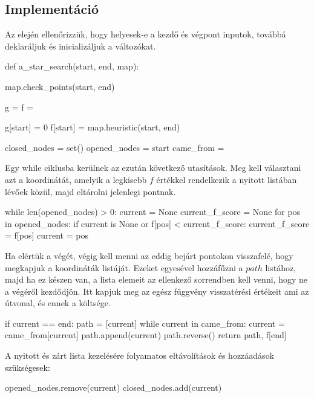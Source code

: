 \subsection{Implementáció}

Az elején ellenőrizzük, hogy helyesek-e a kezdő és végpont inputok, továbbá deklaráljuk és inicializáljuk a változókat.
\begin{python}
def a_star_search(start, end, map):

    map.check_points(start, end)

    g = {}  
    f = {}  

    g[start] = 0
    f[start] = map.heuristic(start, end)

    closed_nodes = set()
    opened_nodes = {start}
    came_from = {}
\end{python}

\bigskip

Egy while ciklusba kerülnek az ezután következő utasítások. Meg kell választani azt a koordinátát, amelyik a legkisebb $ f $ értékkel rendelkezik a nyitott listában lévőek közül, majd eltárolni jelenlegi pontnak. 
\begin{python}
	while len(opened_nodes) > 0:
        current = None
        current_f_score = None
        for pos in opened_nodes:
            if current is None or f[pos] < current_f_score:
                current_f_score = f[pos]
                current = pos

\end{python}

\bigskip

Ha elértük a végét, végig kell menni az eddig bejárt pontokon visszafelé, hogy megkapjuk a koordináták listáját. Ezeket egyesével hozzáfűzni a $ path $ listához, majd ha ez készen van, a lista elemeit az ellenkező sorrendben kell venni, hogy ne a végéről kezdődjön. Itt kapjuk meg az egész függvény visszatérési értékeit ami az útvonal, és ennek a költsége.
\begin{python}
	if current == end:
            path = [current]
            while current in came_from:
                current = came_from[current]
                path.append(current)
            path.reverse()
            return path, f[end]
\end{python}

\bigskip

A nyitott és zárt lista kezelésére folyamatos eltávolítások és hozzáadások szükségesek:

\begin{python}
	opened_nodes.remove(current)
        closed_nodes.add(current)
\end{python}

